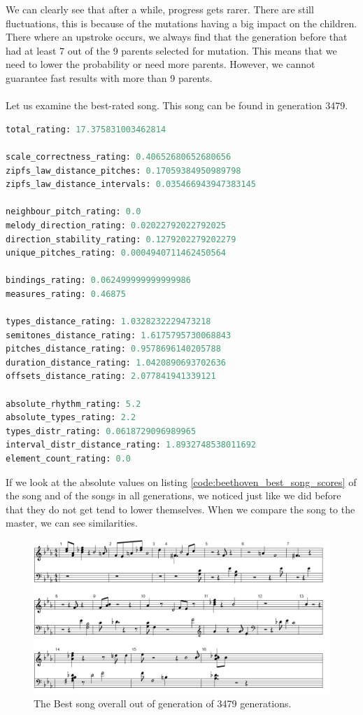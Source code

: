\documentclass[a4paper]{article}
\begin{document}
We can clearly see that after a while, progress gets rarer. There are still fluctuations, this is because of the mutations having a big impact on the children. There where an upstroke occurs, we always find that the generation before that had at least 7 out of the 9 parents selected for mutation. This means that we need to lower the probability or need more parents. However, we cannot guarantee fast results with more than 9 parents. \\\\
Let us examine the best-rated song. This song can be found in generation 3479.

\begin{lstlisting}[language=Python,caption={Best gen song's ratings.},captionpos=b,label=code:beethoven_best_song_scores]
total_rating: 17.375831003462814

scale_correctness_rating: 0.40652680652680656
zipfs_law_distance_pitches: 0.17059384950989798
zipfs_law_distance_intervals: 0.035466943947383145

neighbour_pitch_rating: 0.0
melody_direction_rating: 0.02022792022792025
direction_stability_rating: 0.1279202279202279
unique_pitches_rating: 0.0004940711462450564

bindings_rating: 0.062499999999999986
measures_rating: 0.46875

types_distance_rating: 1.0328232229473218
semitones_distance_rating: 1.6175795730068843
pitches_distance_rating: 0.9578696140205788
duration_distance_rating: 1.0420890693702636
offsets_distance_rating: 2.077841941339121

absolute_rhythm_rating: 5.2
absolute_types_rating: 2.2
types_distr_rating: 0.0618729096989965
interval_distr_distance_rating: 1.8932748538011692
element_count_rating: 0.0
\end{lstlisting}

If we look at the absolute values on listing \ref{code:beethoven_best_song_scores} of the song and of the songs in all generations, we noticed just like we did before that they do not get tend to lower themselves. When we compare the song to the master, we can see similarities.

\begin{figure}[H]
	\advance\leftskip-1.5cm
	\includegraphics[width=1.2\textwidth]{Fotos/results/beethoven/best.png}
	\caption{The Best song overall out of generation of 3479 generations.}
	\label{fig:beethoven_best}
\end{figure}
\end{document}
